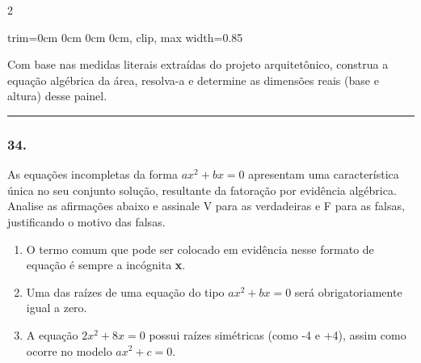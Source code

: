 \documentclass[twoside, 10pt, a4paper]{article}
\newlength{\espacoPreQuestao}\setlength{\espacoPreQuestao}{0.1cm}
\newlength{\espacoQuestao}\setlength{\espacoQuestao}{0.2cm}
\newcommand{\larguraTikz}{0.85\linewidth}
\begin{document}
\begin{multicols*}{2}
\begin{center}
\begin{adjustbox}{trim=0cm 0cm 0cm 0cm, clip, max width=\larguraTikz}
\end{adjustbox}
\end{center}

Com base nas medidas literais extraídas do projeto arquitetônico, construa a equação algébrica da área, resolva-a e determine as dimensões reais (base e altura) desse painel.
\par\vspace{\espacoQuestao}

\noindent\textcolor{CorLinha}{\rule{\linewidth}{0.5pt}} 
\par\vspace{\espacoPreQuestao}
\subsubsection*{34.} As equações incompletas da forma $ ax^2 + bx = 0 $ apresentam uma característica única no seu conjunto solução, resultante da fatoração por evidência algébrica. Analise as afirmações abaixo e assinale V para as verdadeiras e F para as falsas, justificando o motivo das falsas.
\begin{enumerate}[label=\Roman*.]
    \item O termo comum que pode ser colocado em evidência nesse formato de equação é sempre a incógnita \textbf{x}.
    \item Uma das raízes de uma equação do tipo $ ax^2 + bx = 0 $ será obrigatoriamente igual a zero.
    \item A equação $ 2x^2 + 8x = 0 $ possui raízes simétricas (como -4 e +4), assim como ocorre no modelo $ ax^2 + c = 0 $.
\end{enumerate}
\par\vspace{\espacoQuestao}


\end{multicols*}
\end{document}
